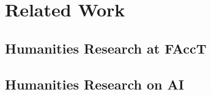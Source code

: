 \section{Related Work}
\subsection{Humanities Research at FAccT}


\subsection{Humanities Research on AI}
